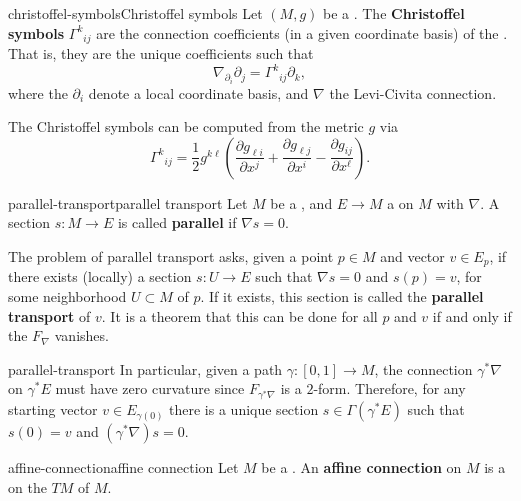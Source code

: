\begin{topic}{christoffel-symbols}{Christoffel symbols}
    Let $(M, g)$ be a . The \textbf{Christoffel symbols} ${\Gamma^k}_{ij}$ are the connection coefficients (in a given coordinate basis) of the . That is, they are the unique coefficients such that
    \[ \nabla_{\partial_i} \partial_j = {\Gamma^k}_{ij} \partial_k , \]
    where the $\partial_i$ denote a local coordinate basis, and $\nabla$ the Levi-Civita connection.
    
    The Christoffel symbols can be computed from the metric $g$ via
    \[ {\Gamma^k}_{ij} = \frac{1}{2} g^{k \ell} \left(\frac{\partial g_{\ell i}}{\partial x^j} + \frac{\partial g_{\ell j}}{\partial x^i} - \frac{\partial g_{ij}}{\partial x^\ell} \right) . \]
\end{topic}

\begin{topic}{parallel-transport}{parallel transport}
    Let $M$ be a , and $E \to M$ a  on $M$ with  $\nabla$. A section $s : M \to E$ is called \textbf{parallel} if $\nabla s = 0$.
    
    The problem of parallel transport asks, given a point $p \in M$ and vector $v \in E_p$, if there exists (locally) a section $s : U \to E$ such that $\nabla s = 0$ and $s(p) = v$, for some neighborhood $U \subset M$ of $p$. If it exists, this section is called the \textbf{parallel transport} of $v$. It is a theorem that this can be done for all $p$ and $v$ if and only if the  $F_\nabla$ vanishes.
\end{topic}

\begin{example}{parallel-transport}
    In particular, given a path $\gamma : [0, 1] \to M$, the connection $\gamma^* \nabla$ on $\gamma^* E$ must have zero curvature since $F_{\gamma^* \nabla}$ is a $2$-form. Therefore, for any starting vector $v \in E_{\gamma(0)}$ there is a unique section $s \in \Gamma(\gamma^* E)$ such that $s(0) = v$ and $(\gamma^* \nabla) s = 0$.
\end{example}

\begin{topic}{affine-connection}{affine connection}
    Let $M$ be a . An \textbf{affine connection} on $M$ is a  on the  $TM$ of $M$.
\end{topic}

